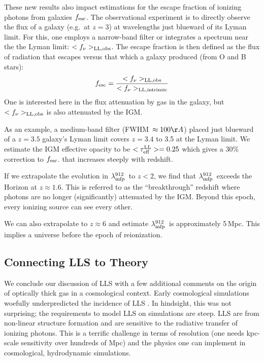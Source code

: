 \documentclass[graybox]{svmult}
\def\mlmfp{\lambda_{\rm mfp}^{912}}
\def\lmfp{$\mlmfp$}
\def\mtll{\tau_{\rm eff}^{\rm LL}}
\begin{document}
These new results also impact estimations for the escape fraction
of ionizing photons from galaxies $f_{\rm esc}$.
The observational experiment is to directly observe the flux
of a galaxy (e.g.\ at $z=3$) at wavelengths
just blueward of its Lyman limit.  For this, one employs
a narrow-band filter \cite[e.g.]{nestor1X}
or integrates a spectrum near
the the Lyman limit: $<f_\nu>_{\rm LL,obs}$.
The escape fraction is then defined as the
flux of radiation that escapes
versus that which a galaxy produced (from O and B stars):
\begin{equation}
f_{\rm esc} = \frac{<f_\nu>_{\rm LL,obs}}{
<f_\nu>_{\rm LL,intrinsic}}
\end{equation}
One is interested here in the flux attenuation by gas in the galaxy,
but $<f_\nu>_{\rm LL,obs}$ is also attenuated by the IGM.

As an example, a medium-band filter (FWHM~$\approx 100\AA$)
placed just blueward of a $z=3.5$ galaxy's 
Lyman limit covers $z=3.4$ to 3.5 at the Lyman limit.
We estimate the IGM effective opacity to be $<\mtll> = 0.25$
which gives a 30\% correction to $f_{\rm esc}$.
that increases steeply with redshift.


If we extrapolate the evolution in \lmfp\ to $z<2$,
we find that \lmfp\ exceeds the Horizon at $z \approx 1.6$. 
This is referred to as the ``breakthrough'' redshift
where photons are no longer (significantly) attenuated
by the IGM.  Beyond this epoch, every ionizing source can 
see every other.

We can also extrapolate to $z \approx 6$
and estimate \lmfp\ is approximately 5\,Mpc.
This implies a universe before the epoch
of reionization.

\subsection{Connecting LLS to Theory}
\label{sec:lls_theory}

We conclude our discussion of LLS with a few additional comments
on the origin of optically thick gas in a cosmological context.
Early cosmological simulations woefully underpredicted
the incidence of LLS \cite{gardner01}.   In hindsight, this
was not surprising; the requirements to model LLS on simulations
are steep.
LLS are from non-linear structure formation and
are sensitive to the radiative transfer of ionizing photons.
This is a terrific challenge in terms of resolution
(one needs kpc-scale sensitivity over hundreds of Mpc)
and the physics one can implement in cosmological, hydrodynamic
simulations.
\end{document}
